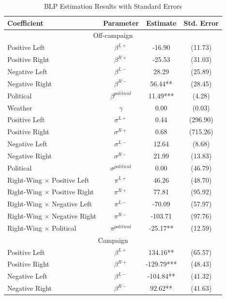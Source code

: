 \documentclass[12pt]{article}
\begin{document}
\begin{table}[!htbp]
	\caption{BLP Estimation Results with Standard Errors}
	\label{tab:results_blp}
	\centering
	\begin{threeparttable}
		\begin{tabular}{lccc}
			\hline
			\textbf{Coefficient} & \textbf{Parameter} & \textbf{Estimate} & \textbf{Std. Error} \\
			\hline
			\multicolumn{4}{c}{Off-campaign} \\
			\hline
			\hline
			Positive Left & $\beta^{L+}$ & -16.90 & (11.73) \\
			Positive Right & $\beta^{R+}$ & -25.53 & (31.03) \\
			Negative Left & $\beta^{L-}$ & 28.29 & (25.89) \\
			Negative Right & $\beta^{R-}$ & 56.44** & (28.45) \\
			Political & $\beta^{political}$ & 11.49*** & (4.28) \\
			Weather & $\gamma$ & 0.00 & (0.03) \\
			\hline
			Positive Left & $\sigma^{L+}$ & 0.44 & (296.90) \\
			Positive Right & $\sigma^{R+}$ & 0.68 & (715.26) \\
			Negative Left & $\sigma^{L-}$ & 12.64 & (8.68) \\
			Negative Right & $\sigma^{R-}$ & 21.99 & (13.83) \\
			Political & $\sigma^{political}$ & 0.00 & (46.79) \\
			\hline
			Right-Wing $\times$  Positive Left & $\pi^{L+}$ & 46.26 & (48.70) \\
			Right-Wing $\times$  Positive Right & $\pi^{R+}$ & 77.81 & (95.92) \\
			Right-Wing $\times$  Negative Left & $\pi^{L-}$ & -70.09 & (57.97) \\
			Right-Wing $\times$  Negative Right & $\pi^{R-}$ & -103.71 & (97.76) \\
			Right-Wing $\times$  Political & $\pi^{political}$ & -25.17** & (12.59) \\
			\hline
			\hline
			\multicolumn{4}{c}{Campaign} \\
			\hline
			\hline
			Positive Left & $\beta^{L+}$ & 134.16** & (65.57) \\
			Positive Right & $\beta^{R+}$ & -129.79*** & (48.43) \\
			Negative Left & $\beta^{L-}$ & -104.84** & (41.32) \\
			Negative Right & $\beta^{R-}$ & 92.62** & (41.63) \\

\end{tabular}
\end{threeparttable}
\end{table}
\end{document}
